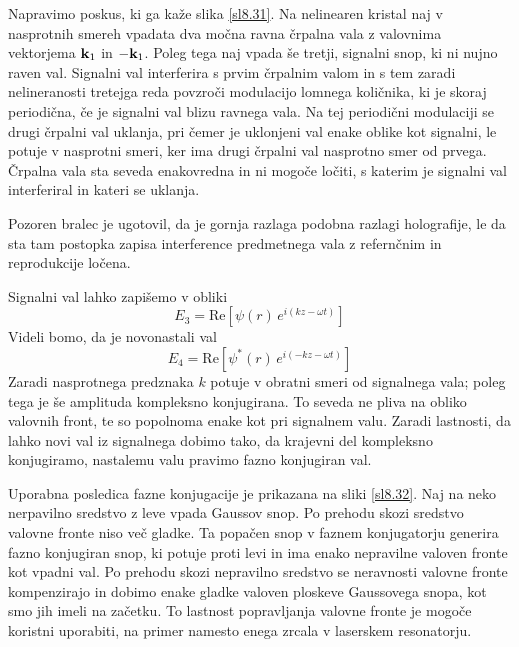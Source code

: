 Napravimo poskus, ki ga kaže slika \ref{sl8.31}. Na nelinearen kristal
naj v nasprotnih smereh vpadata dva močna ravna črpalna vala z valovnima
vektorjema ${\bf k}_{1}$ in $-{\bf k}_{1}$. Poleg tega naj vpada
še tretji, signalni snop, ki ni nujno raven val. Signalni val interferira
s prvim črpalnim valom in s tem zaradi nelineranosti tretejga reda
povzroči modulacijo lomnega količnika, ki je skoraj periodična, če
je signalni val blizu ravnega vala. Na tej periodični modulaciji se
drugi črpalni val uklanja, pri čemer je uklonjeni val enake oblike
kot signalni, le potuje v nasprotni smeri, ker ima drugi črpalni val
nasprotno smer od prvega. Črpalna vala sta seveda enakovredna in ni
mogoče ločiti, s katerim je signalni val interferiral in kateri se
uklanja.

Pozoren bralec je ugotovil, da je gornja razlaga podobna razlagi holografije,
le da sta tam postopka zapisa interference predmetnega vala z refernčnim
in reprodukcije ločena.

Signalni val lahko zapišemo v obliki 
\begin{equation}
E_{3}=\mathrm{Re}\left[\psi\left(r\right)\, e^{i\left(kz-\omega t\right)}\right]\label{8.97}
\end{equation}
 Videli bomo, da je novonastali val 
\begin{equation}
E_{4}=\mathrm{Re}\left[\psi^{*}\left(r\right)\, e^{i\left(-kz-\omega t\right)}\right]\label{8.98}
\end{equation}
 Zaradi nasprotnega predznaka $k$ potuje v obratni smeri od signalnega
vala; poleg tega je še amplituda kompleksno konjugirana. To seveda
ne pliva na obliko valovnih front, te so popolnoma enake kot pri signalnem
valu. Zaradi lastnosti, da lahko novi val iz signalnega dobimo tako,
da krajevni del kompleksno konjugiramo, nastalemu valu pravimo fazno
konjugiran val.

Uporabna posledica fazne konjugacije je prikazana na sliki \ref{sl8.32}.
Naj na neko nerpavilno sredstvo z leve vpada Gaussov snop. Po prehodu
skozi sredstvo valovne fronte niso več gladke. Ta popačen snop v faznem
konjugatorju generira fazno konjugiran snop, ki potuje proti levi
in ima enako nepravilne valoven fronte kot vpadni val. Po prehodu
skozi nepravilno sredstvo se neravnosti valovne fronte kompenzirajo
in dobimo enake gladke valoven ploskeve Gaussovega snopa, kot smo
jih imeli na začetku. To lastnost popravljanja valovne fronte je mogoče
koristni uporabiti, na primer namesto enega zrcala v laserskem resonatorju.


